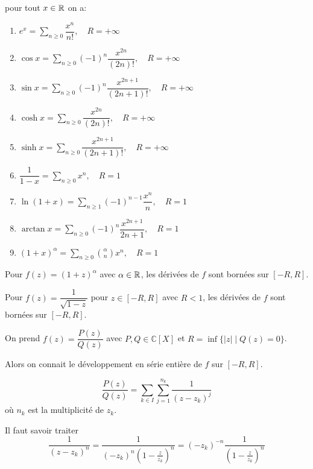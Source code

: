 \documentclass[a4paper,12pt]{article}
\begin{document}
\begin{proposition}
    pour tout $x \in \mathbb{R}$ on a:
    \begin{enumerate}
        \item $e^x = \sum\limits_{n \geq 0} \dfrac{x^n}{n!}, \quad R = +\infty$
        \item $\cos x = \sum\limits_{n \geq 0} (-1)^n \dfrac{x^{2n}}{(2n)!}, \quad R = +\infty$
        \item $\sin x = \sum\limits_{n \geq 0} (-1)^n \dfrac{x^{2n + 1}}{(2n + 1)!}, \quad R = +\infty$
        \item $\cosh x = \sum\limits_{n \geq 0} \dfrac{x^{2n}}{(2n)!}, \quad R = +\infty$
        \item $\sinh x = \sum\limits_{n \geq 0} \dfrac{x^{2n + 1}}{(2n + 1)!}, \quad R = +\infty$
        \item $\dfrac{1}{1 - x} = \sum\limits_{n \geq 0} x^n, \quad R = 1$
        \item $\ln(1 + x) = \sum\limits_{n \geq 1} (-1)^{n - 1} \dfrac{x^n}{n}, \quad R = 1$
        \item $\arctan x = \sum\limits_{n \geq 0} (-1)^n \dfrac{x^{2n + 1}}{2n + 1}, \quad R = 1$
        \item $(1 + x)^\alpha = \sum\limits_{n \geq 0} \binom{\alpha}{n} x^n, \quad R = 1$
    \end{enumerate}
\end{proposition}

\begin{exemple}
    Pour $f(z) = (1 + z)^\alpha$ avec $\alpha \in \mathbb{R}$, les dérivées de $f$ sont bornées sur $[-R, R]$.
\end{exemple}

\begin{exemple}
    Pour $f(z) = \dfrac{1}{\sqrt{1 - z}}$ pour $z \in [-R, R]$ avec $R < 1$, les dérivées de $f$ sont bornées sur $[-R, R]$.
\end{exemple}

\begin{proposition}{}{}
    On prend $f(z) = \dfrac{P(z)}{Q(z)}$ avec $P, Q \in \mathbb{C}[X]$ et $R = \inf\{|z| \mid Q(z) = 0\}$.

    Alors on connait le développement en série entière de $f$ sur $[-R, R]$.

    $$
    \dfrac{P(z)}{Q(z)} = \sum_{k \in I} \sum_{j = 1}^{n_k} \dfrac{1}{(z - z_k)^j}
    $$
    où $n_k$ est la multiplicité de $z_k$.

    Il faut savoir traiter
    $$
    \dfrac{1}{(z - z_k)^n} = \dfrac{1}{(-z_k)^n(1 - \frac{z}{z_k})^n} = (-z_k)^{-n} \dfrac{1}{(1 - \frac{z}{z_k})^n}
    $$
    
\end{proposition}
\end{document}
